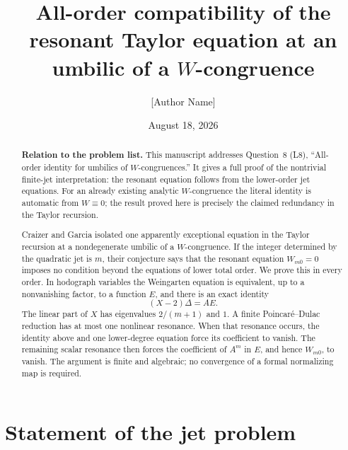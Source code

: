 \documentclass[11pt]{article}
\title{All-order compatibility of the resonant Taylor equation at an
umbilic of a \(W\)-congruence}
\author{[Author Name]}
\date{August 18, 2026}
\theoremstyle{remark}
\begin{document}
\maketitle

\begin{abstract}
\textbf{Relation to the problem list.}
This manuscript addresses Question~8 (L8), ``All-order identity for umbilics
of $W$-congruences.''  It gives a full proof of the nontrivial finite-jet
interpretation: the resonant equation follows from the lower-order jet
equations.  For an already existing analytic $W$-congruence the literal
identity is automatic from $W\equiv0$; the result proved here is precisely the
claimed redundancy in the Taylor recursion.

Craizer and Garcia isolated one apparently exceptional equation in the
Taylor recursion at a nondegenerate umbilic of a \(W\)-congruence.  If the
integer determined by the quadratic jet is \(m\), their conjecture says that
the resonant equation \(W_{m0}=0\) imposes no condition beyond the equations
of lower total order.  We prove this in every order.  In hodograph variables
the Weingarten equation is equivalent, up to a nonvanishing factor, to a
function \(E\), and there is an exact identity
\[
                         (X-2)\Delta=A E.
\]
The linear part of \(X\) has eigenvalues \(2/(m+1)\) and \(1\).  A finite
Poincar\'e--Dulac reduction has at most one nonlinear resonance.  When that
resonance occurs, the identity above and one lower-degree equation force its
coefficient to vanish.  The remaining scalar resonance then forces the
coefficient of \(A^m\) in \(E\), and hence \(W_{m0}\), to vanish.  The
argument is finite and algebraic; no convergence of a formal normalizing
map is required.
\end{abstract}

\section{Statement of the jet problem}
\end{document}
